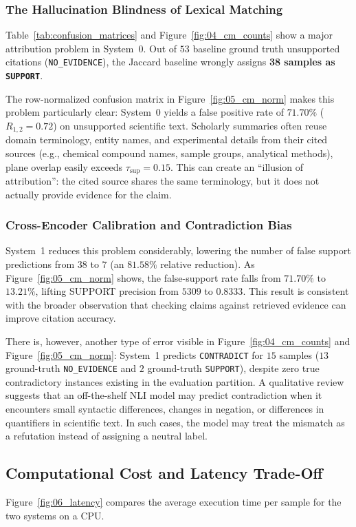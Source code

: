 \documentclass[11pt,a4paper]{article}
\begin{document}
\subsubsection{The Hallucination Blindness of Lexical Matching}
Table~\ref{tab:confusion_matrices} and Figure~\ref{fig:04_cm_counts} show a major attribution problem in System~0. Out of $53$ baseline ground truth unsupported citations (\texttt{NO\_EVIDENCE}), the Jaccard baseline wrongly assigns \textbf{38 samples as \texttt{SUPPORT}}. 

The row-normalized confusion matrix in Figure~\ref{fig:05_cm_norm} makes this problem particularly clear: System~0 yields a false positive rate of $71.70\%$ ($R_{1,2} = 0.72$) on unsupported scientific text. Scholarly summaries often reuse domain terminology, entity names, and experimental details from their cited sources (e.g., chemical compound names, sample groups, analytical methods), plane overlap easily exceeds $\tau_{\text{sup}} = 0.15$. This can create an ``illusion of attribution'': the cited source shares the same terminology, but it does not actually provide evidence for the claim.

\subsubsection{Cross-Encoder Calibration and Contradiction Bias}

System~1 reduces this problem considerably, lowering the number of false support predictions from $38$ to $7$ (an $81.58\%$ relative reduction). As Figure~\ref{fig:05_cm_norm} shows, the false-support rate falls from $71.70\%$ to $13.21\%$, lifting SUPPORT precision from $5309$ to $0.8333$. This result is consistent with the broader observation that checking claims against retrieved evidence can improve citation accuracy.

There is, however, another type of error visible in Figure~\ref{fig:04_cm_counts} and Figure~\ref{fig:05_cm_norm}: System~1 predicts \texttt{CONTRADICT} for $15$ samples ($13$ ground-truth \texttt{NO\_EVIDENCE} and $2$ ground-truth \texttt{SUPPORT}), despite zero true contradictory instances existing in the evaluation partition. A qualitative review suggests that an off-the-shelf NLI model may predict contradiction when it encounters small syntactic differences, changes in negation, or differences in quantifiers in scientific text. In such cases, the model may treat the mismatch as a refutation instead of assigning a neutral label.

\subsection{Computational Cost and Latency Trade-Off}
Figure~\ref{fig:06_latency} compares the average execution time per sample for the two systems on a CPU.
\end{document}
